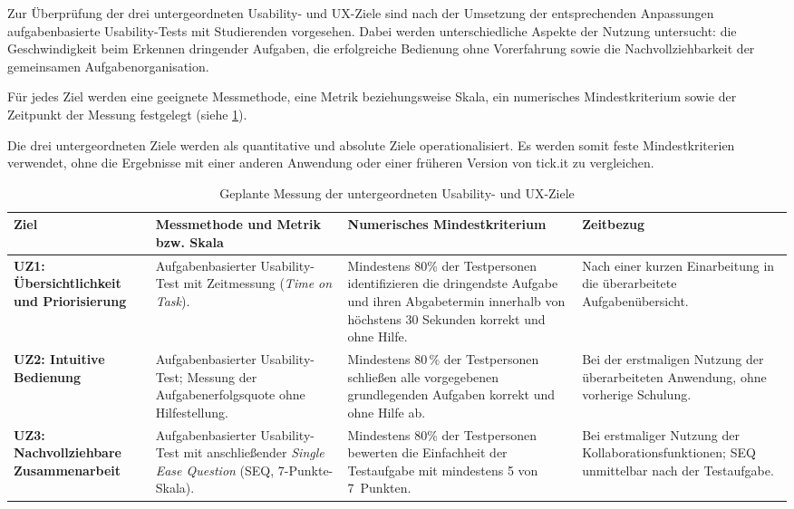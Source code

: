 Zur Überprüfung der drei untergeordneten Usability- und UX-Ziele sind nach der Umsetzung der entsprechenden Anpassungen aufgabenbasierte Usability-Tests mit Studierenden vorgesehen.
Dabei werden unterschiedliche Aspekte der Nutzung untersucht: die Geschwindigkeit beim Erkennen dringender Aufgaben, die erfolgreiche Bedienung ohne Vorerfahrung sowie die Nachvollziehbarkeit der gemeinsamen Aufgabenorganisation.

Für jedes Ziel werden eine geeignete Messmethode, eine Metrik beziehungsweise Skala, ein numerisches Mindestkriterium sowie der Zeitpunkt der Messung festgelegt (siehe \cref{tab:uux_messung}).

Die drei untergeordneten Ziele werden als quantitative und absolute Ziele operationalisiert.
Es werden somit feste Mindestkriterien verwendet, ohne die Ergebnisse mit einer anderen Anwendung oder einer früheren Version von tick.it zu vergleichen.

\begin{table}[htbp]
\centering
\caption{Geplante Messung der untergeordneten Usability- und UX-Ziele}
\label{tab:uux_messung}
\renewcommand{\arraystretch}{1.2}
\begin{tabularx}{\textwidth}{@{}
    >{\raggedright\arraybackslash}p{}
    >{\raggedright\arraybackslash}X
    >{\raggedright\arraybackslash}X
    >{\raggedright\arraybackslash}p{}
@{}}
\toprule
\textbf{Ziel} & \textbf{Messmethode und Metrik bzw. Skala} & \textbf{Numerisches Mindestkriterium} & \textbf{Zeitbezug} \\
\midrule
\textbf{UZ1: Übersichtlichkeit und Priorisierung}
& Aufgabenbasierter Usability-Test mit Zeitmessung (\textit{Time on Task}).
& Mindestens 80\% der Testpersonen identifizieren die dringendste Aufgabe und ihren Abgabetermin innerhalb von höchstens 30 Sekunden korrekt und ohne Hilfe.
& Nach einer kurzen Einarbeitung in die überarbeitete Aufgabenübersicht. \\
\midrule
\textbf{UZ2: Intuitive Bedienung}
& Aufgabenbasierter Usability-Test; Messung der Aufgabenerfolgsquote ohne Hilfestellung.
& Mindestens 80\,\% der Testpersonen schließen alle vorgegebenen grundlegenden Aufgaben korrekt und ohne Hilfe ab.
& Bei der erstmaligen Nutzung der überarbeiteten Anwendung, ohne vorherige Schulung. \\
\midrule
\textbf{UZ3: Nachvollziehbare Zusammenarbeit}
& Aufgabenbasierter Usability-Test mit anschließender \textit{Single Ease Question} (SEQ, 7-Punkte-Skala).
& Mindestens 80\% der Testpersonen bewerten die Einfachheit der Testaufgabe mit mindestens 5 von 7~Punkten.
& Bei erstmaliger Nutzung der Kollaborationsfunktionen; SEQ unmittelbar nach der Testaufgabe. \\
\bottomrule
\end{tabularx}
\end{table}

